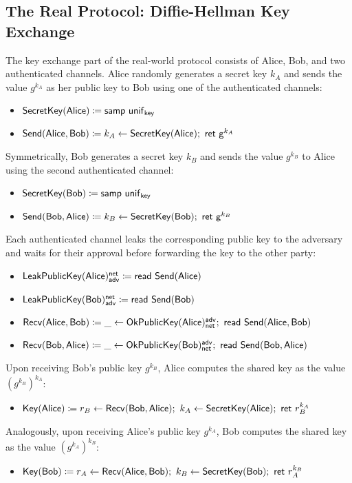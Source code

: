 \subsection{The Real Protocol: Diffie-Hellman Key Exchange}
The key exchange part of the real-world protocol consists of Alice, Bob, and two authenticated channels. Alice randomly generates a secret key $k_A$ and sends the value $g^{k_A}$ as her public key to Bob using one of the authenticated channels:
\begin{itemize}
\item $\mathsf{SecretKey}(\mathsf{Alice}) \coloneqq \mathsf{samp} \ \mathsf{unif}_{\mathsf{key}}$
\item $\mathsf{Send}(\mathsf{Alice},\mathsf{Bob}) \coloneqq k_A \leftarrow \mathsf{SecretKey}(\mathsf{Alice}); \ \mathsf{ret} \ \mathsf{g}^{k_A}$
\end{itemize}
Symmetrically, Bob generates a secret key $k_B$ and sends the value $g^{k_B}$ to Alice using the second authenticated channel:
\begin{itemize}
\item $\mathsf{SecretKey}(\mathsf{Bob}) \coloneqq \mathsf{samp} \ \mathsf{unif}_{\mathsf{key}}$
\item $\mathsf{Send}(\mathsf{Bob},\mathsf{Alice}) \coloneqq k_B \leftarrow \mathsf{SecretKey}(\mathsf{Bob}); \ \mathsf{ret} \ \mathsf{g}^{k_B}$
\end{itemize}
Each authenticated channel leaks the corresponding public key to the adversary and waits for their approval before forwarding the key to the other party:
\begin{itemize}
\item $\mathsf{LeakPublicKey}(\mathsf{Alice})^{\mathsf{net}}_{\mathsf{adv}} \coloneqq \mathsf{read} \ \mathsf{Send}(\mathsf{Alice})$
\item $\mathsf{LeakPublicKey}(\mathsf{Bob})^{\mathsf{net}}_{\mathsf{adv}} \coloneqq \mathsf{read} \ \mathsf{Send}(\mathsf{Bob})$
\item $\Recv(\Alice,\Bob) \coloneqq \_ \leftarrow \OkPublicKey(\Alice)^\adv_\net; \ \read{\Send(\Alice,\Bob)}$
\item $\Recv(\Bob,\Alice) \coloneqq \_ \leftarrow \OkPublicKey(\Bob)^\adv_\net; \ \read{\Send(\Bob,\Alice)}$
\end{itemize}
Upon receiving Bob's public key $g^{k_B}$, Alice computes the shared key as the value $(g^{k_B})^{k_A}$:
\begin{itemize}
\item $\Key(\Alice) \coloneqq r_B \leftarrow \Recv(\Bob,\Alice); \ k_A \leftarrow \SecretKey(\Alice); \ \ret{r_B^{k_A}}$
\end{itemize}
Analogously, upon receiving Alice's public key $g^{k_A}$, Bob computes the shared key as the value $(g^{k_A})^{k_B}$:
\begin{itemize}
\item $\Key(\Bob) \coloneqq r_A \leftarrow \Recv(\Alice,\Bob); \ k_B \leftarrow \SecretKey(\Bob); \ \ret{r_A^{k_B}}$
\end{itemize}
